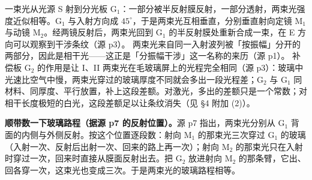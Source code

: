 \documentclass[11pt]{ctexart}
\begin{document}

一束光从光源 S 射到分光板 G$_1$：一部分被半反射膜反射，一部分透射，两束光强度近似相等。G$_1$ 与入射方向成 $45^\circ$，于是两束光互相垂直，分别垂直射向定镜 M$_1$ 与动镜 M$_2$。经两镜反射后，两束光回到 G$_1$ 的半反射膜处重新合成一束，在 E 方向可以观察到干涉条纹（源 p3）。
两束光来自同一入射波列被「按振幅」分开的两部分，因此是相干光——这正是「分振幅干涉」这一名称的来历（源 p1）。
补偿板 G$_2$ 的作用是让 I、II 两束光在毛玻璃屏上的光程完全相同（源 p3）：玻璃中光速比空气中慢，两束光穿过的玻璃厚度不同就会多出一段光程差；G$_2$ 与 G$_1$ 同材料、同厚度、平行放置，补上这段差额。对激光，多出的差额只是一个常数；对相干长度极短的白光，这段差额足以让条纹消失（见 §4 附加 (2)）。

\textbf{顺带数一下玻璃路程（据源 p7 的反射位置）。}源 p7 指出，两束光分别从 G$_1$ 背面的内侧与外侧反射。按这个位置逐段数：射向 M$_1$ 的那束光三次穿过 G$_1$ 的玻璃（入射一次、反射后出射一次、回来的路上再一次）；射向 M$_2$ 的那束光只在入射时穿过一次，回来时直接从膜面反射出去。把 G$_2$ 放进射向 M$_2$ 的那条臂，它出、回各穿一次，这束光也变成三次。于是两束光的玻璃路程相等。
\end{document}
